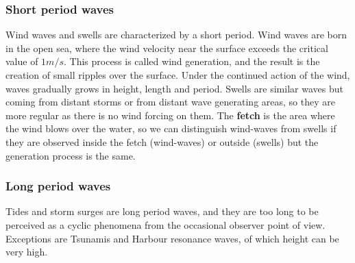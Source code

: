 \subsubsection*{Short period waves}
Wind waves and swells are characterized by a short period. Wind waves are born in the open sea, where the wind velocity near the surface exceeds the critical value of $1 m/s$. This process is called wind generation, and the result is the creation of small ripples over the surface. Under the continued action of the wind, waves gradually grows in height, length and period. Swells are similar waves but coming from distant storms or from distant wave generating areas, so they are more regular as there is no wind forcing on them. The \textbf{fetch} is the area where the wind blows over the water, so we can distinguish wind-waves from swells if they are observed inside the fetch (wind-waves) or outside (swells) but the generation process is the same.
\subsubsection*{Long period waves}
Tides and storm surges are long period waves, and they are too long to be perceived as a cyclic phenomena from the occasional observer point of view. Exceptions are Tsunamis and Harbour resonance waves, of which height can be very high.
